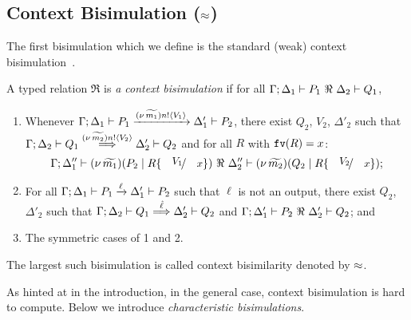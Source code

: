 \subsection{Context Bisimulation ($\approx$)}
\label{subsec:bisimulation}
\noi The first bisimulation which we define 
is the standard (weak) context bisimulation~\cite{San96H}. 
%
\begin{definition}\rm
\label{def:wbc}
A typed relation $\Re$ is {\em a context bisimulation} if
for all $\horel{\Gamma}{\Delta_1}{P_1}{\ \Re \ }{\Delta_2}{Q_1}$, 
	\begin{enumerate}[1)] 
	\item Whenever 
$\Gamma; \Delta_1 \vdash P_1 \xrightarrow{(\nu\, \widetilde{m_1}) n ! \langle V_1 \rangle} \Delta_1' \vdash P_2$,
there exist 
$Q_2$, $V_2$, $\Delta'_2$
such that 
$\Gamma; \Delta_2 \vdash Q_1 \stackrel{(\nu\, \widetilde{m_2}) n ! \langle V_2 \rangle}{\Longrightarrow} \Delta_2' \vdash Q_2$ and 
for all $R$ with $\mathtt{fv}(R)=x$:
\[\horel{\Gamma}{\Delta_1''}{\newsp{\widetilde{m_1}}{P_2 \Par R\subst{V_1}{x}}}
				{\ \Re\ }
				{\Delta_2''}{\newsp{\widetilde{m_2}}{Q_2 \Par R\subst{V_2}{x}}};\]  
		\item	
For all $\Gamma; \Delta_1 \vdash P_1 \xrightarrow{\ell} \Delta_1' \vdash P_2$ such that 
$\ell$ is not an output, 
 there exist $Q_2$, $\Delta'_2$ such that 
$\Gamma; \Delta_2 \vdash Q_1 \stackrel{\hat{\ell}}{\Longrightarrow} \Delta_2' \vdash Q_2$
			and
			$\horel{\Gamma}{\Delta_1'}{P_2}{\ \Re \ }{\Delta_2'}{Q_2}$; and  

                      \item	The symmetric cases of 1 and 2.                
	\end{enumerate}
	The largest such bisimulation is called context bisimilarity  denoted by $\approx$.
\end{definition}

\noi As hinted at in %
the introduction,
in the general case,
context bisimulation 
is hard to compute. Below we introduce 
\emph{characteristic bisimulations}.

